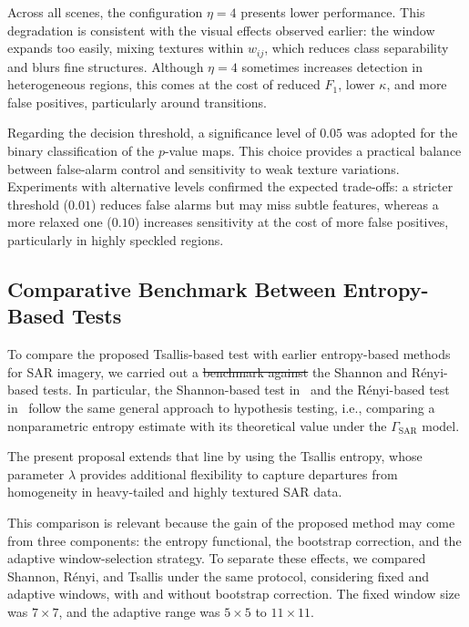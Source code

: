 \documentclass[
  lettersize  journal,
]{IEEEtran}%
\providecommand{\DIFaddtex}[1]{{\protect\color{blue}\uwave{#1}}} %
\providecommand{\DIFdeltex}[1]{{\protect\color{red}\sout{#1}}} %
\providecommand{\DIFaddbegin}{} %
\providecommand{\DIFaddend}{} %
\providecommand{\DIFdelbegin}{} %
\providecommand{\DIFdelend}{} %
\providecommand{\DIFadd}[1]{\texorpdfstring{\DIFaddtex{#1}}{#1}} %
\providecommand{\DIFdel}[1]{\texorpdfstring{\DIFdeltex{#1}}{}} %
\providecommand{\DIFscaledelfig}{0.5}
\newlength{\DIFdelgraphicswidth} %
\newlength{\DIFdelgraphicsheight} %
\providecommand{\DIFaddincludegraphics}[2][]{{\color{blue}\fbox{\DIFOincludegraphics[#1]{#2}}}} %
\providecommand{\DIFdelincludegraphics}[2][]{%
\sbox{\DIFdelgraphicsbox}{\DIFOincludegraphics[#1]{#2}}%
\settoboxwidth{\DIFdelgraphicswidth}{\DIFdelgraphicsbox} %
\settoboxtotalheight{\DIFdelgraphicsheight}{\DIFdelgraphicsbox} %
\scalebox{\DIFscaledelfig}{%
\parbox[b]{\DIFdelgraphicswidth}{\usebox{\DIFdelgraphicsbox}\\[-\baselineskip] \rule{\DIFdelgraphicswidth}{0em}}\llap{\resizebox{\DIFdelgraphicswidth}{\DIFdelgraphicsheight}{%
\setlength{\unitlength}{\DIFdelgraphicswidth}%
\begin{picture}(1,1)%
\thicklines\linethickness{2pt} %
{\color[rgb]{1,0,0}\put(0,0){\framebox(1,1){}}}%
{\color[rgb]{1,0,0}\put(0,0){\line( 1,1){1}}}%
{\color[rgb]{1,0,0}\put(0,1){\line(1,-1){1}}}%
\end{picture}%
}\hspace*{3pt}}} %
} %
\DeclareRobustCommand{\DIFaddbegin}{\DIFOaddbegin \let\includegraphics\DIFaddincludegraphics} %
\DeclareRobustCommand{\DIFaddend}{\DIFOaddend \let\includegraphics\DIFOincludegraphics} %
\DeclareRobustCommand{\DIFdelbegin}{\DIFOdelbegin \let\includegraphics\DIFdelincludegraphics} %
\DeclareRobustCommand{\DIFdelend}{\DIFOaddend \let\includegraphics\DIFOincludegraphics} %
\begin{document}
Across all scenes, the configuration \(\eta = 4\) presents lower
performance. This degradation is consistent with the visual effects
observed earlier: the window expands too easily, mixing textures within
\(w_{ij}\), which reduces class separability and blurs fine structures.
Although \(\eta = 4\) sometimes increases detection in heterogeneous
regions, this comes at the cost of reduced \(F_1\), lower \(\kappa\),
and more false positives, particularly around transitions.

Regarding the decision threshold, a significance level of \(0.05\) was
adopted for the binary classification of the \(p\)-value maps. This
choice provides a practical balance between false-alarm control and
sensitivity to weak texture variations. Experiments with alternative
levels confirmed the expected trade-offs: a stricter threshold
(\(0.01\)) reduces false alarms but may miss subtle features, whereas a
more relaxed one (\(0.10\)) increases sensitivity at the cost of more
false positives, particularly in highly speckled regions.

\subsection{Comparative Benchmark Between Entropy-Based
Tests}\label{sec:entropy-benchmark}

To compare the proposed Tsallis-based test with earlier entropy-based
methods for SAR imagery, we carried out a \DIFdelbegin \DIFdel{benchmark against }\DIFdelend \DIFaddbegin \DIFadd{comparison with }\DIFaddend the Shannon
and Rényi-based tests. In particular, the Shannon-based test
in~ and the Rényi-based test
in~ follow the same general approach
to hypothesis testing, i.e., comparing a nonparametric entropy estimate
with its theoretical value under the \(\Gamma_{\mathrm{SAR}}\) model.

The present proposal extends that line by using the Tsallis entropy,
whose parameter \(\lambda\) provides additional flexibility to capture
departures from homogeneity in heavy-tailed and highly textured SAR
data.

This comparison is relevant because the gain of the proposed method may
come from three components: the entropy functional, the bootstrap
correction, and the adaptive window-selection strategy. To separate
these effects, we compared Shannon, Rényi, and Tsallis under the same
protocol, considering fixed and adaptive windows, with and without
bootstrap correction. The fixed window size was \(7\times7\), and the
adaptive range was \(5\times5\) to \(11\times11\).
\end{document}
